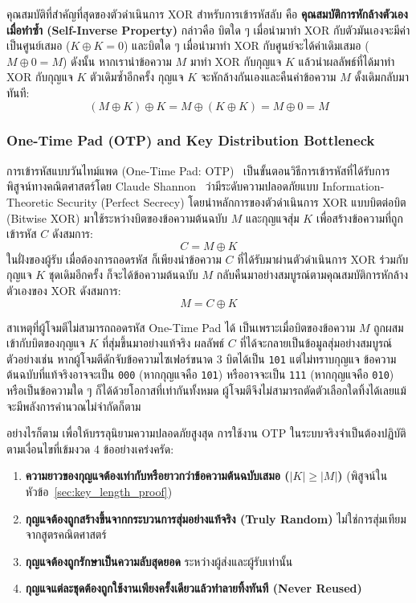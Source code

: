 คุณสมบัติที่สำคัญที่สุดของตัวดำเนินการ XOR สำหรับการเข้ารหัสลับ คือ \textbf{คุณสมบัติการหักล้างตัวเองเมื่อทำซ้ำ (Self-Inverse Property)} กล่าวคือ บิตใด ๆ เมื่อนำมาทำ XOR กับตัวมันเองจะมีค่าเป็นศูนย์เสมอ ($K \oplus K = 0$) และบิตใด ๆ เมื่อนำมาทำ XOR กับศูนย์จะได้ค่าเดิมเสมอ ($M \oplus 0 = M$) ดังนั้น หากเรานำข้อความ $M$ มาทำ XOR กับกุญแจ $K$ แล้วนำผลลัพธ์ที่ได้มาทำ XOR กับกุญแจ $K$ ตัวเดิมซ้ำอีกครั้ง กุญแจ $K$ จะหักล้างกันเองและคืนค่าข้อความ $M$ ดั้งเดิมกลับมาทันที:
\begin{equation}
    (M \oplus K) \oplus K = M \oplus (K \oplus K) = M \oplus 0 = M
\end{equation}

\subsubsection{One-Time Pad (OTP) and Key Distribution Bottleneck}
การเข้ารหัสแบบวันไทม์แพด (One-Time Pad: OTP)~\cite{vernam_cipher} เป็นขั้นตอนวิธีการเข้ารหัสที่ได้รับการพิสูจน์ทางคณิตศาสตร์โดย Claude Shannon~\cite{shannon_secure} ว่ามีระดับความปลอดภัยแบบ Information-Theoretic Security (Perfect Secrecy) โดยนำหลักการของตัวดำเนินการ XOR แบบบิตต่อบิต (Bitwise XOR) มาใช้ระหว่างบิตของข้อความต้นฉบับ $M$ และกุญแจสุ่ม $K$ เพื่อสร้างข้อความที่ถูกเข้ารหัส $C$ ดังสมการ:
\begin{equation}
    C = M \oplus K
    \label{eq:otp_enc}
\end{equation}
ในฝั่งของผู้รับ เมื่อต้องการถอดรหัส ก็เพียงนำข้อความ $C$ ที่ได้รับมาผ่านตัวดำเนินการ XOR ร่วมกับกุญแจ $K$ ชุดเดิมอีกครั้ง ก็จะได้ข้อความต้นฉบับ $M$ กลับคืนมาอย่างสมบูรณ์ตามคุณสมบัติการหักล้างตัวเองของ XOR ดังสมการ:
\begin{equation}
    M = C \oplus K
\end{equation}

สาเหตุที่ผู้โจมตีไม่สามารถถอดรหัส One-Time Pad ได้ เป็นเพราะเมื่อบิตของข้อความ $M$ ถูกผสมเข้ากับบิตของกุญแจ $K$ ที่สุ่มขึ้นมาอย่างแท้จริง ผลลัพธ์ $C$ ที่ได้จะกลายเป็นข้อมูลสุ่มอย่างสมบูรณ์ ตัวอย่างเช่น หากผู้โจมตีดักจับข้อความไซเฟอร์ขนาด 3 บิตได้เป็น \texttt{101} แต่ไม่ทราบกุญแจ ข้อความต้นฉบับที่แท้จริงอาจจะเป็น \texttt{000} (หากกุญแจคือ \texttt{101}) หรืออาจจะเป็น \texttt{111} (หากกุญแจคือ \texttt{010}) หรือเป็นข้อความใด ๆ ก็ได้ด้วยโอกาสที่เท่ากันทั้งหมด ผู้โจมตีจึงไม่สามารถตัดตัวเลือกใดทิ้งได้เลยแม้จะมีพลังการคำนวณไม่จำกัดก็ตาม

อย่างไรก็ตาม เพื่อให้บรรลุนิยามความปลอดภัยสูงสุด การใช้งาน OTP ในระบบจริงจำเป็นต้องปฏิบัติตามเงื่อนไขที่เข้มงวด 4 ข้ออย่างเคร่งครัด:
\begin{enumerate}
    \item \textbf{ความยาวของกุญแจต้องเท่ากับหรือยาวกว่าข้อความต้นฉบับเสมอ ($|K| \ge |M|$)} (พิสูจน์ในหัวข้อ~\ref{sec:key_length_proof})
    \item \textbf{กุญแจต้องถูกสร้างขึ้นจากกระบวนการสุ่มอย่างแท้จริง (Truly Random)} ไม่ใช่การสุ่มเทียมจากสูตรคณิตศาสตร์
    \item \textbf{กุญแจต้องถูกรักษาเป็นความลับสุดยอด} ระหว่างผู้ส่งและผู้รับเท่านั้น
    \item \textbf{กุญแจแต่ละชุดต้องถูกใช้งานเพียงครั้งเดียวแล้วทำลายทิ้งทันที (Never Reused)}
\end{enumerate}

